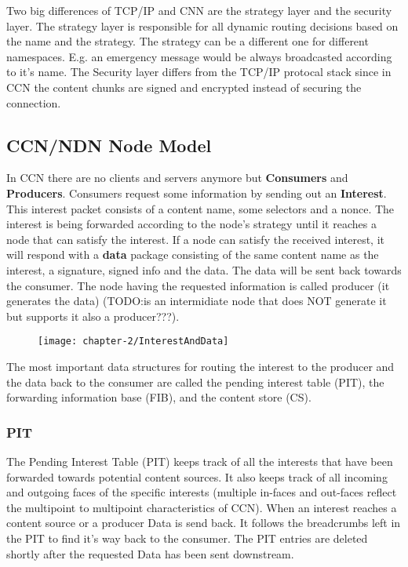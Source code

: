 Two big differences of TCP/IP and CNN are the strategy layer and the security layer. The strategy layer is responsible for all dynamic routing decisions based on the name and the strategy. The strategy can be a different one for different namespaces. E.g. an emergency message would be always broadcasted according to it's name. The Security layer differs from the TCP/IP protocal stack since in CCN the content chunks are signed and encrypted instead of securing the connection.

\subsection{CCN/NDN Node Model}

In CCN there are no clients and servers anymore but \textbf{Consumers} and \textbf{Producers}. Consumers request some information by sending out an \textbf{Interest}. This interest packet consists of a content name, some selectors and a nonce. The interest is being forwarded according to the node's strategy until it reaches a node that can satisfy the interest. If a node can satisfy the received interest, it will respond with a \textbf{data} package consisting of the same content name as the interest, a signature, signed info and the data. The data will be sent back towards the consumer. The node having the requested information is called producer (it generates the data) (TODO:is an intermidiate node that does NOT generate it but supports it also a producer???).

\begin{figure}[h]
\texttt{[image: chapter-2/InterestAndData]}
\centering
\end{figure}

The most important data structures for routing the interest to the producer and the data back to the consumer are called the pending interest table (PIT), the forwarding information base (FIB), and the content store (CS).

\subsubsection{PIT}

The Pending Interest Table (PIT) keeps track of all the interests that have been forwarded towards potential content sources. It also keeps track of all incoming and outgoing faces of the specific interests (multiple in-faces and out-faces reflect the multipoint to multipoint characteristics of CCN). When an interest reaches a content source or a producer Data is send back. It follows the breadcrumbs left in the PIT to find it's way back to the consumer. The PIT entries are deleted shortly after the requested Data has been sent downstream.

